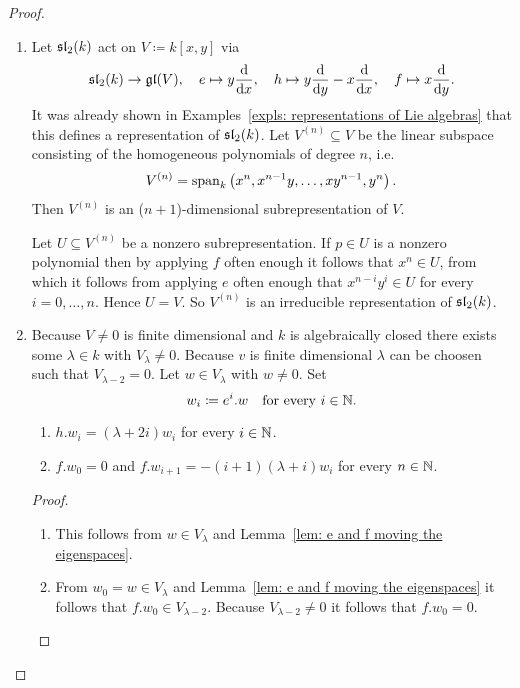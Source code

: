\begin{proof}
 \begin{enumerate}[leftmargin=*]
  \item
   Let $\mathfrak{sl}_2(k)$ act on $V \coloneqq k[x,y]$ via
   \[
    \mathfrak{sl}_2(k) \to \mathfrak{gl}(V), \quad
    e \mapsto y\frac{\text{d}}{\text{d}x}, \quad
    h \mapsto y\frac{\text{d}}{\text{d}y}-x\frac{\text{d}}{\text{d}x}, \quad
    f \mapsto x\frac{\text{d}}{\text{d}y}.
   \]
   It was already shown in Examples~\ref{expls: representations of Lie algebras} that this defines a representation of $\mathfrak{sl}_2(k)$. Let $V^{(n)} \subseteq V$ be the linear subspace consisting of the homogeneous polynomials of degree $n$, i.e.\
   \[
    V^{(n)} = \operatorname{span}_k\left( x^n, x^{n-1} y, \dotsc, x y^{n-1}, y^n \right).
   \]
   Then $V^{(n)}$ is an ($n+1$)-dimensional subrepresentation of $V$.
   
   Let $U \subseteq V^{(n)}$ be a nonzero subrepresentation. If $p \in U$ is a nonzero polynomial then by applying $f$ often enough it follows that $x^n \in U$, from which it follows from applying $e$ often enough that $x^{n-i} y^i \in U$ for every $i = 0, \dotsc, n$. Hence $U = V$. So $V^{(n)}$ is an irreducible representation of $\mathfrak{sl}_2(k)$.
   
  \item
   Because $V \neq 0$ is finite dimensional and $k$ is algebraically closed there exists some $\lambda \in k$ with $V_\lambda \neq 0$. Because $v$ is finite dimensional $\lambda$ can be choosen such that $V_{\lambda-2} = 0$. Let $w \in V_\lambda$ with $w \neq 0$. Set
   \[
    w_i \coloneqq e^i.w \quad \text{for every $i \in \mathbb{N}$}.
   \]
   \begin{claim*}
    \begin{enumerate}[leftmargin=*]
     \item
      $h.w_i = (\lambda+2i) w_i$ for every $i \in \mathbb{N}$.
     \item
      $f.w_0 = 0$ and $f.w_{i+1} = -(i+1)(\lambda+i)w_i$ for every $n \in \mathbb{N}$.
    \end{enumerate}
   \end{claim*}
   \begin{proof}
    \begin{enumerate}[leftmargin=*]
     \item
      This follows from $w \in V_\lambda$ and Lemma~\ref{lem: e and f moving the eigenspaces}.
     \item
      From $w_0 = w \in V_\lambda$ and Lemma~\ref{lem: e and f moving the eigenspaces} it follows that $f.w_0 \in V_{\lambda-2}$. Because $V_{\lambda-2} \neq 0$ it follows that $f.w_0 = 0$.
      

\end{enumerate}
\end{proof}
\end{enumerate}
\end{proof}
